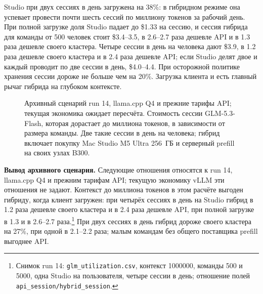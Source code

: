 Studio при двух сессиях в день загружена на 38\%: в гибридном режиме она успевает провести почти шесть сессий по миллиону токенов за рабочий день. При полной загрузке доля Studio падает до \$1.33 на сессию, и сессия
гибрида для команды от 500 человек стоит \$3.4--3.5, в 2.6--2.7 раза дешевле API и в 1.3 раза дешевле своего кластера. Четыре сессии в день на человека дают \$3.9, в 1.2 раза дешевле своего кластера и в 2.4 раза дешевле API; если Studio делят двое и каждый проводит по две сессии в день, \$4.0--4.4. При осторожной политике хранения сессии дороже не больше чем на 20\%. Загрузка клиента и есть главный
рычаг гибрида на глубоком контексте.

\begin{figure}[t]
\centering
{}
\caption{Архивный сценарий run 14, llama.cpp Q4 и прежние тарифы API; текущая экономика ожидает пересчёта. Стоимость сессии GLM-5.3-Flash, которая дорастает до миллиона токенов, в зависимости от размера команды. Две
такие сессии в день на человека; гибрид включает покупку Mac Studio M5 Ultra 256~ГБ и серверный prefill на своих узлах
B300.}
\label{fig:million}
\end{figure}

\textbf{Вывод архивного сценария.} Следующие отношения относятся к run 14, llama.cpp Q4 и прежним тарифам API; текущую экономику vLLM эти отношения не задают. Контекст до миллиона токенов в этом расчёте выгоден гибриду, когда клиент загружен: при четырёх сессиях в день на
Studio гибрид в 1.2 раза дешевле своего кластера и в 2.4 раза дешевле API, при полной загрузке в 1.3 и
в 2.6--2.7 раза.\footnote{Снимок run 14: \texttt{glm\_utilization.csv}, контекст 1000000, команды 500 и 5000, одна Studio на пользователя, четыре сессии в день; отношение полей \texttt{api\_session/hybrid\_session}.} При двух сессиях в день гибрид дороже своего кластера на 27\%, при одной в 2.1--2.2 раза;
малым командам без общего поставщика prefill выгоднее API.

